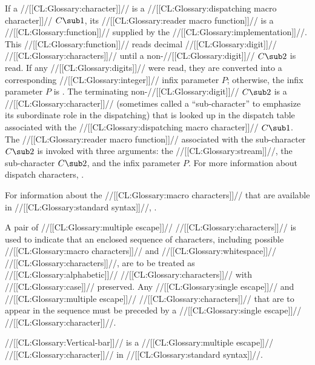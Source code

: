 {If a //[[CL:Glossary:character]]// is a //[[CL:Glossary:dispatching macro character]]// $C\sub 1$, its //[[CL:Glossary:reader macro function]]// is a //[[CL:Glossary:function]]// supplied by the //[[CL:Glossary:implementation]]//. This //[[CL:Glossary:function]]// reads decimal //[[CL:Glossary:digit]]// //[[CL:Glossary:characters]]// until a non-//[[CL:Glossary:digit]]// $C\sub 2$ is read. If any //[[CL:Glossary:digits]]// were read, they are converted into a corresponding //[[CL:Glossary:integer]]// infix parameter $P$; otherwise, the infix parameter $P$ is \nil.   The terminating non-//[[CL:Glossary:digit]]// $C\sub 2$ is a //[[CL:Glossary:character]]//  (sometimes called a ``sub-character'' to emphasize its subordinate role in the dispatching) that is looked up in the dispatch table associated with the //[[CL:Glossary:dispatching macro character]]// $C\sub 1$. The //[[CL:Glossary:reader macro function]]// associated with the sub-character $C\sub 2$  is invoked with three arguments:
     the //[[CL:Glossary:stream]]//,
     the sub-character $C\sub 2$,
 and the infix parameter $P$. For more information about dispatch characters, .

For information about the //[[CL:Glossary:macro characters]]//  that are available in //[[CL:Glossary:standard syntax]]//, \seesection\StandardMacroChars.

\endsubsubsection%

 

A pair of //[[CL:Glossary:multiple escape]]// //[[CL:Glossary:characters]]// is used to indicate that an enclosed sequence of characters, including possible //[[CL:Glossary:macro characters]]// and //[[CL:Glossary:whitespace]]// //[[CL:Glossary:characters]]//, are to be treated as //[[CL:Glossary:alphabetic]]// //[[CL:Glossary:characters]]//  with //[[CL:Glossary:case]]// preserved. Any //[[CL:Glossary:single escape]]// and //[[CL:Glossary:multiple escape]]// //[[CL:Glossary:characters]]//  that are to appear in the sequence must be preceded by a //[[CL:Glossary:single escape]]//  //[[CL:Glossary:character]]//.  

//[[CL:Glossary:Vertical-bar]]// is a //[[CL:Glossary:multiple escape]]// //[[CL:Glossary:character]]// in //[[CL:Glossary:standard syntax]]//.


}
